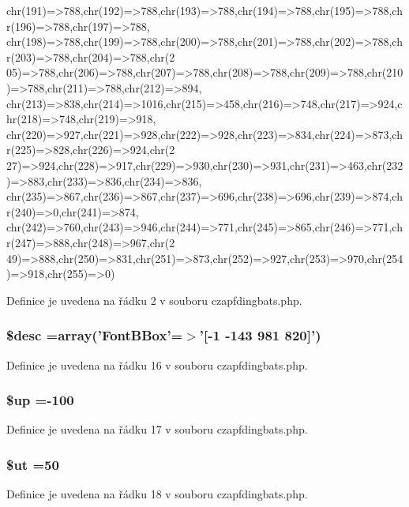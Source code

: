 \begin{DoxyCode}
      chr(191)=>788,chr(192)=>788,chr(193)=>788,chr(194)=>788,chr(195)=>788,chr(196)=>788,chr(197)=>788,
    chr(198)=>788,chr(199)=>788,chr(200)=>788,chr(201)=>788,chr(202)=>788,chr(203)=>788,chr(204)=>788,chr(2
      05)=>788,chr(206)=>788,chr(207)=>788,chr(208)=>788,chr(209)=>788,chr(210)=>788,chr(211)=>788,chr(212)=>894,
      chr(213)=>838,chr(214)=>1016,chr(215)=>458,chr(216)=>748,chr(217)=>924,chr(218)=>748,chr(219)=>918,
    chr(220)=>927,chr(221)=>928,chr(222)=>928,chr(223)=>834,chr(224)=>873,chr(225)=>828,chr(226)=>924,chr(2
      27)=>924,chr(228)=>917,chr(229)=>930,chr(230)=>931,chr(231)=>463,chr(232)=>883,chr(233)=>836,chr(234)=>836,
      chr(235)=>867,chr(236)=>867,chr(237)=>696,chr(238)=>696,chr(239)=>874,chr(240)=>0,chr(241)=>874,
    chr(242)=>760,chr(243)=>946,chr(244)=>771,chr(245)=>865,chr(246)=>771,chr(247)=>888,chr(248)=>967,chr(2
      49)=>888,chr(250)=>831,chr(251)=>873,chr(252)=>927,chr(253)=>970,chr(254)=>918,chr(255)=>0)
\end{DoxyCode}


Definice je uvedena na řádku 2 v souboru czapfdingbats.\-php.

\hypertarget{czapfdingbats_8php_a31059b9e4d0c5af34df20da32232ea9a}{
\subsubsection[{\$desc}]{\setlength{\rightskip}{0pt plus 5cm}\$desc =array('Font\-B\-Box'=$>$'\mbox{[}-\/1 -\/143 981 820\mbox{]}')}}\label{czapfdingbats_8php_a31059b9e4d0c5af34df20da32232ea9a}


Definice je uvedena na řádku 16 v souboru czapfdingbats.\-php.

\hypertarget{czapfdingbats_8php_a6b5ad2ac55f9df46e8f34e78fbd6f176}{
\subsubsection[{\$up}]{\setlength{\rightskip}{0pt plus 5cm}\$up =-\/100}}\label{czapfdingbats_8php_a6b5ad2ac55f9df46e8f34e78fbd6f176}


Definice je uvedena na řádku 17 v souboru czapfdingbats.\-php.

\hypertarget{czapfdingbats_8php_aadd3f841051043ee58e587e840e8dd0b}{
\subsubsection[{\$ut}]{\setlength{\rightskip}{0pt plus 5cm}\$ut =50}}\label{czapfdingbats_8php_aadd3f841051043ee58e587e840e8dd0b}


Definice je uvedena na řádku 18 v souboru czapfdingbats.\-php.

